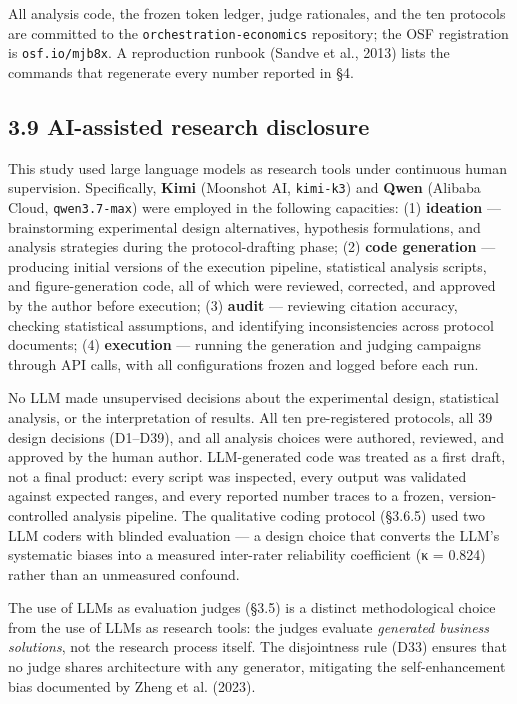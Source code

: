 \documentclass[11pt,a4paper]{article}
\begin{document}
All analysis code, the frozen token ledger, judge rationales, and the
ten protocols are committed to the \texttt{orchestration-economics}
repository; the OSF registration is \texttt{osf.io/mjb8x}. A reproduction
runbook (Sandve et al., 2013) lists the commands that regenerate every
number reported in §4.

\subsection{3.9 AI-assisted research disclosure}

This study used large language models as research tools under continuous
human supervision. Specifically, \textbf{Kimi} (Moonshot AI, \texttt{kimi-k3}) and
\textbf{Qwen} (Alibaba Cloud, \texttt{qwen3.7-max}) were employed in the following
capacities: (1) \textbf{ideation} — brainstorming experimental design
alternatives, hypothesis formulations, and analysis strategies during
the protocol-drafting phase; (2) \textbf{code generation} — producing initial
versions of the execution pipeline, statistical analysis scripts, and
figure-generation code, all of which were reviewed, corrected, and
approved by the author before execution; (3) \textbf{audit} — reviewing
citation accuracy, checking statistical assumptions, and identifying
inconsistencies across protocol documents; (4) \textbf{execution} — running
the generation and judging campaigns through API calls, with all
configurations frozen and logged before each run.

No LLM made unsupervised decisions about the experimental design,
statistical analysis, or the interpretation of results. All ten
pre-registered protocols, all 39 design decisions (D1–D39), and all
analysis choices were authored, reviewed, and approved by the human
author. LLM-generated code was treated as a first draft, not a final
product: every script was inspected, every output was validated against
expected ranges, and every reported number traces to a frozen,
version-controlled analysis pipeline. The qualitative coding protocol
(§3.6.5) used two LLM coders with blinded evaluation — a design choice
that converts the LLM's systematic biases into a measured inter-rater
reliability coefficient (κ = 0.824) rather than an unmeasured confound.

The use of LLMs as evaluation judges (§3.5) is a distinct methodological
choice from the use of LLMs as research tools: the judges evaluate
\textit{generated business solutions}, not the research process itself. The
disjointness rule (D33) ensures that no judge shares architecture with
any generator, mitigating the self-enhancement bias documented by
Zheng et al. (2023).
\end{document}
